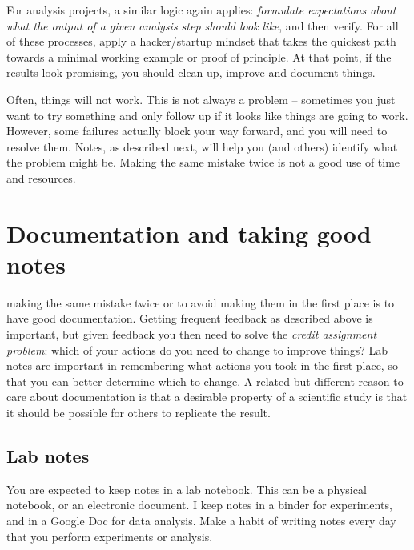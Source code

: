\documentclass{tufte-book}
\begin{document}
For analysis projects, a similar logic again applies: {\it formulate
  expectations about what the output of a given analysis step should
  look like}, and then verify. For all of these processes, apply a
hacker/startup mindset that takes the quickest path towards a minimal
working example or proof of principle. At that point, if the results
look promising, you should clean up, improve and document things.

Often, things will not work. This is not always a problem -- sometimes
you just want to try something and only follow up if it looks like
things are going to work. However, some failures actually block your
way forward, and you will need to resolve them. Notes, as described
next, will help you (and others) identify what the problem might
be. Making the same mistake twice is not a good use of time and
resources.


\section{Documentation and taking good notes}\label{sec:notes}
\label{sec:notes}

 making the same mistake twice or to
avoid making them in the first place is to have good
documentation. Getting frequent feedback as described above is
important, but given feedback you then need to solve the {\it credit
  assignment problem}: which of your actions do you need to change to
improve things?  Lab notes
are important in remembering what actions you took in the first place,
so that you can better determine which to change. A related but
different reason to care about documentation is that a desirable
property of a scientific study is that it should be possible for
others to replicate the result.

\subsection{Lab notes}

You are expected to keep notes in a lab notebook. This can be a
physical notebook, or an electronic document. I keep notes in a binder
for experiments, and in a Google Doc for data analysis. Make a habit of writing notes every day that
you perform experiments or analysis.
\end{document}
